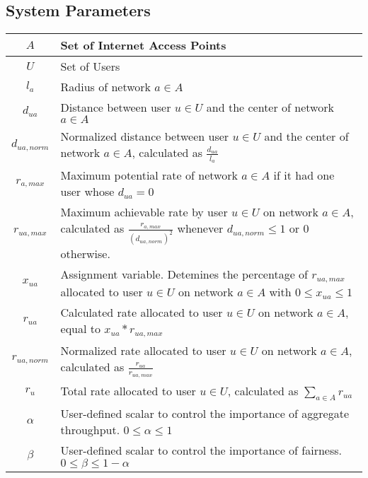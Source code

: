 \documentclass[11pt]{article}
\begin{document}
\subsection{System Parameters}
\begin{center}
\renewcommand\arraystretch{1.3}
\begin{tabular}{| c | p{12cm} |}
\hline
$A$ & Set of Internet Access Points \\ 
\hline
$U$ & Set of Users \\ 
\hline
$l_a$ & Radius of network $a \in A$ \\
\hline
$d_{ua}$ & Distance between user $u \in U$ and the center of network $a \in A$ \\ 
\hline
$d_{ua,norm}$ & Normalized distance between user $u \in U$ and the center of network $a \in A$, calculated as $\displaystyle\frac{d_{ua}}{l_a}$ \\[8pt] 
\hline
$r_{a,max}$ & Maximum potential rate of network $a \in A$ if it had one user whose $d_{ua} = 0$ \\ 
\hline
$r_{ua,max}$ & Maximum achievable rate by user $u \in U$ on network $a \in A$, calculated as $\displaystyle\frac{r_{a,max}}{(d_{ua,norm})^2}$ whenever $d_{ua,norm} \leq 1$ or 0 otherwise. \\[8pt] 
\hline
$x_{ua}$ & Assignment variable. Detemines the percentage of $r_{ua,max}$ allocated to user $u \in U$ on network $a \in A$ with $0 \leq x_{ua} \leq 1$ \\ 
\hline
$r_{ua}$ & Calculated rate allocated to user $u \in U$ on network $a \in A$, equal to $x_{ua} * r_{ua,max}$ \\ 
\hline
$r_{ua,norm}$ & Normalized rate allocated to user $u \in U$ on network $a \in A$, calculated as $\displaystyle\frac{r_{ua}}{r_{ua,max}}$ \\[8pt] 
\hline
$r_{u}$ & Total rate allocated to user $u \in U$, calculated as $\sum_{a \in A} r_{ua}$ \\ 
\hline
$\alpha$ & User-defined scalar to control the importance of aggregate throughput. $0 \leq \alpha \leq 1$ \\
\hline
$\beta$ & User-defined scalar to control the importance of fairness. $0 \leq \beta \leq 1 - \alpha$ \\
\hline
\end{tabular}
\end{center}
\pagebreak
\end{document}
